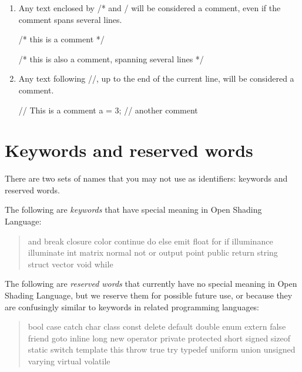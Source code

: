 \documentclass[11pt,letterpaper]{book}
\def\langname{Open Shading Language\xspace}
\begin{document}
\begin{enumerate}
\item Any text enclosed by {\cf /*} and {\cf */} will be considered
a comment, even if the comment spans several lines.

\begin{code}
    /* this is a comment */

    /* this is also
       a comment, spanning
       several lines */
\end{code}

\item Any text following {\cf //}, up to the end of the current line,
will be considered a comment.

\begin{code}
    // This is a comment
    a = 3;   // another comment
\end{code}
\end{enumerate}


\section{Keywords and reserved words}
\label{sec:lexical:keyreserved}

There are two sets of names that you may not use as identifiers:
keywords and reserved words.

The following are \emph{keywords} that have special meaning in
\langname: 

\begin{quote} {\cf

and break closure color continue do else emit float for if illuminance
illuminate int matrix normal not or output point public return string struct
vector void while

}
\end{quote}

The following are \emph{reserved words} that currently have no special
meaning in \langname, but we reserve them for possible future use, or
because they are confusingly similar to keywords in related programming
languages: 

\begin{quote} {\cf

bool case catch char class const delete default double 
enum extern false friend
goto inline long new operator private protected 
short signed sizeof static 
switch template this throw true try typedef 
uniform union unsigned varying virtual volatile

}
\end{quote}
\end{document}
